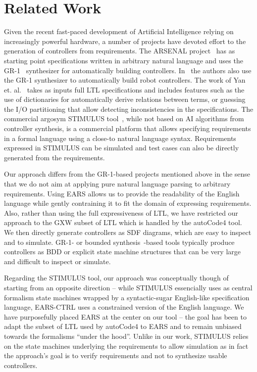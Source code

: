 \section{Related Work}
\vspace{-.2cm}Given the recent fast-paced development of Artificial Intelligence
relying on increasingly powerful hardware, a number of projects have devoted
effort to the generation of controllers from requirements. The ARSENAL
project~\cite{ghosh2016arsenal} has as starting point specifications written in
arbitrary natural language and uses the GR-1~\cite{piterman2006synthesis}
synthesizer for automatically building controllers. In~\cite{kress2008translating} the
authors also use the GR-1 synthesizer to automatically build robot
controllers. The work of Yan et. al.~\cite{YanCC15} takes as inputs full LTL
specifications and includes features such as the use of dictionaries for
automatically derive relations between terms, or guessing the I/O partitioning
that allow detecting inconsistencies in the specifications. The commercial
argosym STIMULUS tool~\cite{jeannet16}, while not based on AI algorithms from controller
synthesis, is a commercial platform that allows specifying requirements in a 
formal language using a close-to natural language syntax. Requirements expressed
in STIMULUS can be simulated and test cases can also be directly generated from
the requirements.

Our approach differs from the GR-1-based projects mentioned above in the sense
that we do not aim at applying pure natural language parsing to arbitrary
requirements. Using EARS allows us to provide the readability of the English
language while gently contraining it to fit the domain of expressing
requirements. Also, rather than using the full expressiveness of LTL, we have
restricted our approach to the \textsf{GXW} subset of LTL which is handled by
the \textsf{autoCode4} tool. We then directly generate controllers as SDF
diagrams, which are easy to inspect and to simulate. GR-1- or bounded
synthesis~\cite{schewe2007bounded}-based tools typically produce controllers as
BDD or explicit state machine structures that can be very large and difficult to inspect or simulate.

Regarding the STIMULUS tool, our approach was conceptually though of starting
from an opposite direction -- while STIMULUS essencially uses as central
formalism state machines wrapped by a syntactic-sugar English-like specification
language, \textsf{EARS-CTRL} uses a constrained version of the English language.
We have purposefully placed EARS at the center on our tool -- the goal has been
to adapt the subset of LTL used by \textsf{autoCode4} to EARS and to remain
unbiased towards the formalisms ``under the hood''. Unlike in our work, STIMULUS
relies on the state machines underlying the requirements to allow simulation as
in fact the approach's goal is to verify requirements and not to synthesize
usable controllers.\vspace{-.6cm}

